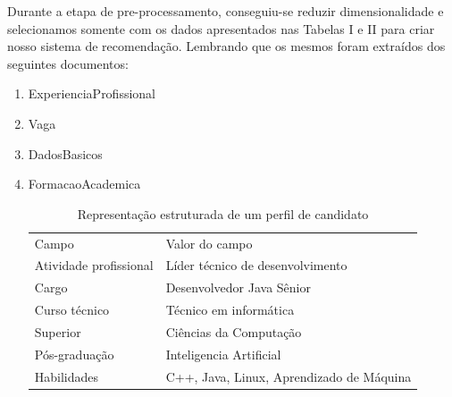 \documentclass[conference]{IEEEtran}
\begin{document}
Durante a etapa de pre-processamento, conseguiu-se reduzir dimensionalidade e selecionamos somente com os dados apresentados nas Tabelas I e II para criar nosso sistema de recomendação. Lembrando que os mesmos foram extraídos dos seguintes documentos: 
\begin{enumerate}
\item ExperienciaProfissional
\item Vaga
\item DadosBasicos
\item FormacaoAcademica
								
\begin{table}[h]
 \centering
 {\renewcommand\arraystretch{1.25}
\caption{Representação estruturada de um perfil de candidato}
 \begin{tabular}{ l l }
  \cline{1-1}\cline{2-2}  
    \multicolumn{1}{|p{3.0cm}|}{\cellcolor{}Campo \centering } &
    \multicolumn{1}{p{4.217cm}|}{\cellcolor{}Valor do campo \centering }
  \\  
  \cline{1-1}\cline{2-2}  
    \multicolumn{1}{|p{3.0cm}|}{Atividade profissional } &
    \multicolumn{1}{p{4.217cm}|}{ Líder técnico de desenvolvimento}
  \\  
  \cline{1-1}\cline{2-2}  
    \multicolumn{1}{|p{3.0cm}|}{  Cargo } &
    \multicolumn{1}{p{4.217cm}|}{ Desenvolvedor Java Sênior}
  \\  
  \cline{1-1}\cline{2-2}  
    \multicolumn{1}{|p{3.0cm}|}{  Curso técnico} &
    \multicolumn{1}{p{4.217cm}|}{Técnico em informática }
  \\  
  \cline{1-1}\cline{2-2}  
    \multicolumn{1}{|p{3.0cm}|}{  Superior} &
    \multicolumn{1}{p{4.217cm}|}{ Ciências da Computação }
  \\  
  \cline{1-1}\cline{2-2}  
    \multicolumn{1}{|p{3.0cm}|}{  Pós-graduação} &
    \multicolumn{1}{p{4.217cm}|}{ Inteligencia Artificial}
  \\  
  \cline{1-1}\cline{2-2}  
    \multicolumn{1}{|p{3.0cm}|}{  Habilidades } &
    \multicolumn{1}{p{4.217cm}|}{ C++, Java, Linux, Aprendizado de Máquina }
  \\  
  \hline
 \end{tabular} }
\end{table}


\end{enumerate}
\end{document}
